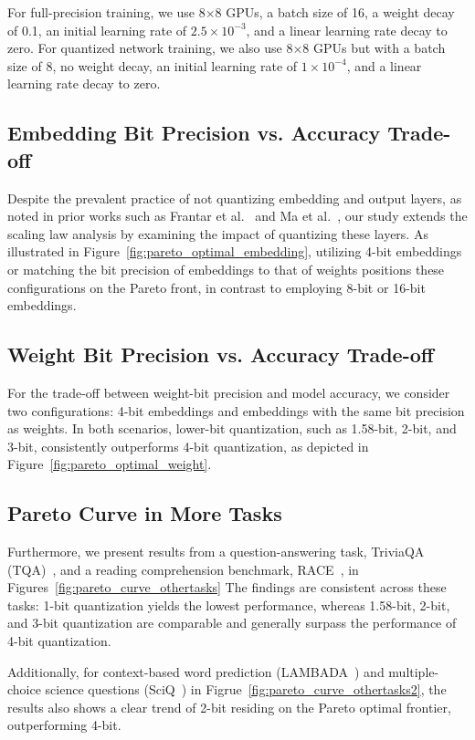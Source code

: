 For full-precision training, we use 8×8 GPUs, a batch size of 16, a weight decay of 0.1, an initial learning rate of \(2.5 \times 10^{-3}\), and a linear learning rate decay to zero. For quantized network training, we also use 8×8 GPUs but with a batch size of 8, no weight decay, an initial learning rate of \(1 \times 10^{-4}\), and a linear learning rate decay to zero.

\subsection{Embedding Bit Precision vs. Accuracy Trade-off}

Despite the prevalent practice of not quantizing embedding and output layers, as noted in prior works such as Frantar et al.~\cite{frantar2022gptq} and Ma et al.~\cite{ma2024era}, our study extends the scaling law analysis by examining the impact of quantizing these layers. As illustrated in Figure~\ref{fig:pareto_optimal_embedding}, utilizing 4-bit embeddings or matching the bit precision of embeddings to that of weights positions these configurations on the Pareto front, in contrast to employing 8-bit or 16-bit embeddings.

\subsection{Weight Bit Precision vs. Accuracy Trade-off}

For the trade-off between weight-bit precision and model accuracy, we consider two configurations: 4-bit embeddings and embeddings with the same bit precision as weights. In both scenarios, lower-bit quantization, such as 1.58-bit, 2-bit, and 3-bit, consistently outperforms 4-bit quantization, as depicted in Figure~\ref{fig:pareto_optimal_weight}.

\subsection{Pareto Curve in More Tasks}

Furthermore, we present results from a question-answering task, TriviaQA (TQA)~\cite{joshi2017triviaqa}, and a reading comprehension benchmark, RACE~\cite{lai2017race}, in Figures~\ref{fig:pareto_curve_othertasks} The findings are consistent across these tasks: 1-bit quantization yields the lowest performance, whereas 1.58-bit, 2-bit, and 3-bit quantization are comparable and generally surpass the performance of 4-bit quantization.

Additionally, for context-based word prediction (LAMBADA~\cite{paperno2016lambada}) and multiple-choice science questions (SciQ~\cite{welbl2017crowdsourcing}) in Figrue~\ref{fig:pareto_curve_othertasks2}, the results also shows a clear trend of 2-bit residing on the Pareto optimal frontier, outperforming 4-bit.

